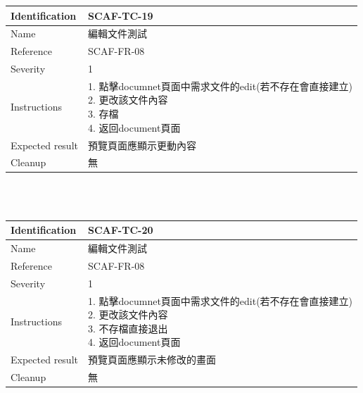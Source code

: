 \documentclass{report}
\begin{document}
\begin{tabularx}{\textwidth}{
  |p{}%
  |p{}|%
  }
  \hline
  \centering Identification &  SCAF-TC-19 \\
  \hline
  \centering Name & 編輯文件測試 \\
  \hline
  \centering Reference & SCAF-FR-08 \\
  \hline
  \centering Severity & 1 \\
  \hline
  \centering Instructions & 
  \makecell[l]{
    1. 點擊documnet頁面中需求文件的edit(若不存在會直接建立) \\
    2. 更改該文件內容  \\
    3. 存檔  \\
    4. 返回document頁面
  }\\
  \hline
  \centering Expected result & 預覽頁面應顯示更動內容 \\
  \hline
  \centering Cleanup & 無 \\
  \hline
\end{tabularx}
\\
\newline
\\
\begin{tabularx}{\textwidth}{
  |p{}%
  |p{}|%
  }
  \hline
  \centering Identification &  SCAF-TC-20 \\
  \hline
  \centering Name & 編輯文件測試 \\
  \hline
  \centering Reference & SCAF-FR-08 \\
  \hline
  \centering Severity & 1 \\
  \hline
  \centering Instructions & 
  \makecell[l]{
    1. 點擊documnet頁面中需求文件的edit(若不存在會直接建立) \\
    2. 更改該文件內容  \\
    3. 不存檔直接退出  \\
    4. 返回document頁面
  }\\
  \hline
  \centering Expected result & 預覽頁面應顯示未修改的畫面 \\
  \hline
  \centering Cleanup & 無 \\
  \hline
\end{tabularx}
\\
\newline
\\
\end{document}
